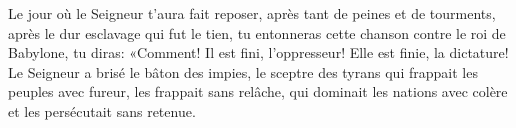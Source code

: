 Le jour où le Seigneur t’aura fait reposer, après tant de peines et de tourments,
	après le dur esclavage qui fut le tien,
	tu entonneras cette chanson contre le roi de Babylone,
	tu diras: «Comment! Il est fini, l’oppresseur! Elle est finie, la dictature!
Le Seigneur a brisé le bâton des impies, le sceptre des tyrans
	qui frappait les peuples avec fureur, les frappait sans relâche,
	qui dominait les nations avec colère et les persécutait sans retenue.
